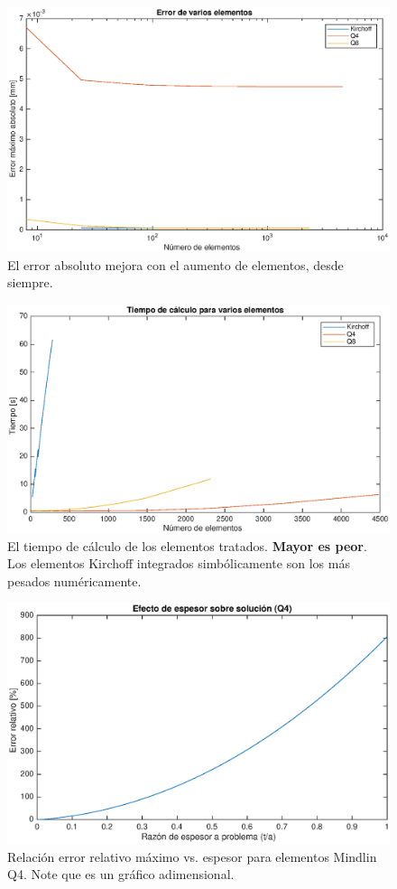 \documentclass[onecolumn,10pt,titlepage]{article}
\begin{document}
\begin{figure}[htb!]
	\centering
	\includegraphics[width=.9\textwidth]{fig/errvec.eps}
	\caption{El error absoluto mejora con el aumento de elementos, desde siempre.}\label{fig:errorplacas}
\end{figure}

\begin{figure}[htb!]
	\centering
	\includegraphics[width=.9\textwidth]{fig/time.eps}
	\caption{El tiempo de cálculo de los elementos tratados. \textbf{Mayor es peor}. Los elementos Kirchoff integrados simbólicamente son los más pesados numéricamente.}
	\label{fig:timeplacas}
\end{figure}

\begin{figure}[htb!]
	\centering
	\includegraphics[width=.9\textwidth]{fig/espesor.eps}
	\caption{Relación error relativo máximo vs. espesor para elementos Mindlin Q4. Note que es un gráfico adimensional.}
	\label{fig:espesorplacas}
\end{figure}
\end{document}
